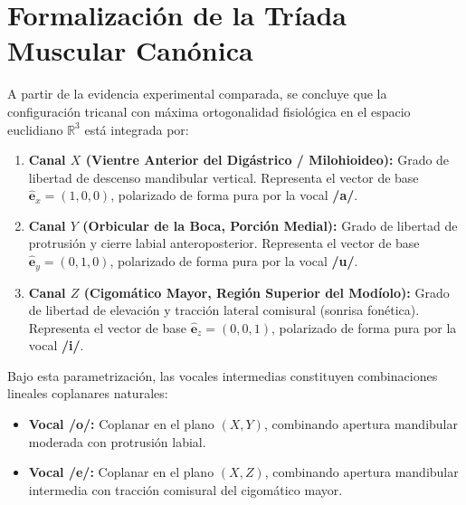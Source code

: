 \documentclass[11pt,a4paper,openany]{book}
\theoremstyle{definition}
\begin{document}
\section{Formalización de la Tríada Muscular Canónica}
\label{sec:triada_canonica}

A partir de la evidencia experimental comparada, se concluye que la configuración tricanal con máxima ortogonalidad fisiológica en el espacio euclidiano $\mathbb{R}^3$ está integrada por:

\begin{enumerate}
    \item \textbf{Canal $X$ (Vientre Anterior del Digástrico / Milohioideo):}
    Grado de libertad de descenso mandibular vertical. Representa el vector de base $\hat{\mathbf{e}}_x = (1, 0, 0)$, polarizado de forma pura por la vocal \textbf{/a/}.
    \item \textbf{Canal $Y$ (Orbicular de la Boca, Porción Medial):}
    Grado de libertad de protrusión y cierre labial anteroposterior. Representa el vector de base $\hat{\mathbf{e}}_y = (0, 1, 0)$, polarizado de forma pura por la vocal \textbf{/u/}.
    \item \textbf{Canal $Z$ (Cigomático Mayor, Región Superior del Modíolo):}
    Grado de libertad de elevación y tracción lateral comisural (sonrisa fonética). Representa el vector de base $\hat{\mathbf{e}}_z = (0, 0, 1)$, polarizado de forma pura por la vocal \textbf{/i/}.
\end{enumerate}

Bajo esta parametrización, las vocales intermedias constituyen combinaciones lineales coplanares naturales:
\begin{itemize}
    \item \textbf{Vocal /o/:} Coplanar en el plano $(X, Y)$, combinando apertura mandibular moderada con protrusión labial.
    \item \textbf{Vocal /e/:} Coplanar en el plano $(X, Z)$, combinando apertura mandibular intermedia con tracción comisural del cigomático mayor.
\end{itemize}
\end{document}
